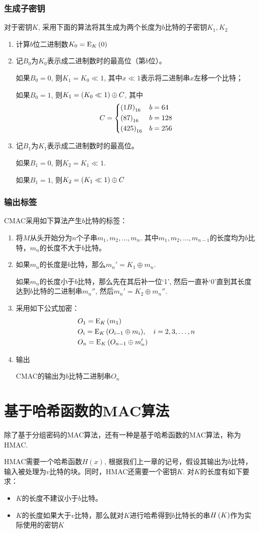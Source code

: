 \subsubsection{生成子密钥}
对于密钥$K$, 采用下面的算法将其生成为两个长度为$b$比特的子密钥$K_1, K_2$
\begin{enumerate}
	\item 计算$b$位二进制数$K_0={\mathrm{E}_{K}\left({0}\right)}$
	\item 记$B_0$为$K_0$表示成二进制数时的最高位（第$b$位）。\par
	如果$B_0=0$, 则$K_1=K_0\ll 1$, 其中$x\ll 1$表示将二进制串$x$左移一个比特；\par
	如果$B_0=1$, 则$K_1=\left( {K_0\ll 1}\right)\oplus C$, 其中
	\[C=\begin{dcases}\left( {1B}\right)_{16}&b=64\\\left( {87}\right)_{16}&b=128\\\left( {425}\right)_{16}&b=256\end{dcases}\]
	\item 记$B_1$为$K_1$表示成二进制数时的最高位。\par
	如果$B_1=0$, 则$K_2=K_1\ll 1$.\par
	如果$B_1=1$, 则$K_2=\left( {K_1\ll 1}\right)\oplus C$
\end{enumerate}
\subsubsection{输出标签}
CMAC采用如下算法产生$b$比特的标签：
\begin{enumerate}
	\item 将$M$从头开始分为$n$个子串$m_1, m_2, \ldots, m_n$. 其中$m_1, m_2,\ldots, m_{n-1}$的长度均为$b$比特，$m_n$的长度不大于$b$比特。
	\item 如果$m_n$的长度是$b$比特，那么$m_n'=K_1\oplus m_n$.\par
	如果$m_n$的长度小于$b$比特，那么先在其后补一位`1', 然后一直补`0'直到其长度达到$b$比特的二进制串$m_n''$, 然后$m_n'=K_2\oplus m_n''$.
	\item 采用如下公式加密：
	\begin{align*}
	&O_1={\mathrm{E}_{K}\left({m_1}\right)}\\
	&O_{i}={\mathrm{E}_{K}\left({O_{i-1}\oplus m_{i}}\right)},\quad i=2, 3,\ldots, n\\
	&O_n={\mathrm{E}_{K}\left({O_{n-1}\oplus m_n'}\right)}
	\end{align*}
	\item 输出\par
	CMAC的输出为$b$比特二进制串$O_n$
\end{enumerate}
\section{基于哈希函数的MAC算法}
除了基于分组密码的MAC算法，还有一种是基于哈希函数的MAC算法，称为HMAC.\par
HMAC需要一个哈希函数$H(x)$, 根据我们上一章的记号，假设其输出为$b$比特，输入被处理为$v$比特的块。同时，HMAC还需要一个密钥$K$. 对$K$的长度有如下要求：
\begin{itemize}
\item $K$的长度不建议小于$b$比特。
\item $K$的长度如果大于$v$比特，那么就对$K$进行哈希得到$b$比特长的串$H\left( {K}\right)$作为实际使用的密钥$K$
\end{itemize}

